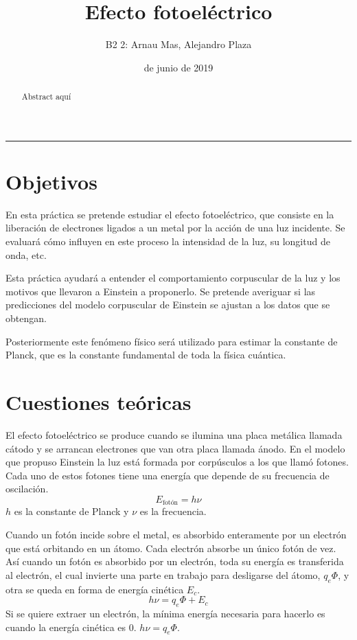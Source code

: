 \documentclass[12pt]{article}
\title{\sffamily {\bfseries Práctica 10:} Efecto fotoeléctrico}
\author{\sffamily B2 2: Arnau Mas, Alejandro Plaza}
\date{\sffamily 6 de junio de 2019}
\numberwithin{table}{section}
\numberwithin{figure}{section}
\numberwithin{equation}{section}
\begin{document}
\maketitle
\renewcommand{\abstractname}{\sffamily \bfseries Resumen:}
\begin{abstract}
	Abstract aquí
\end{abstract}
\hrule

\section{Objetivos}
En esta práctica se pretende estudiar el efecto fotoeléctrico, que consiste en la liberación de electrones ligados a un metal por la acción de una luz incidente. Se evaluará cómo influyen en este proceso la intensidad de la luz, su longitud de onda, etc.

Esta práctica ayudará a entender el comportamiento corpuscular de la luz y los motivos que llevaron a Einstein a proponerlo. Se pretende averiguar si las predicciones del modelo corpuscular de Einstein se ajustan a los datos que se obtengan.

Posteriormente este fenómeno físico será utilizado para estimar la constante de Planck, que es la constante fundamental de toda la física cuántica.

\section{Cuestiones teóricas}
El efecto fotoeléctrico se produce cuando se ilumina una placa metálica llamada cátodo y se arrancan electrones que van otra placa llamada ánodo. En el modelo que propuso Einstein la luz está formada por corpúsculos a los que llamó fotones. Cada uno de estos fotones tiene una energía que depende de su frecuencia de oscilación.
\begin{equation}\label{P10Efoton}
	E_{\text{fotón}}=h\nu
\end{equation}
$h$ es la constante de Planck y $\nu$ es la frecuencia.

Cuando un fotón incide sobre el metal, es absorbido enteramente por un electrón que está orbitando en un átomo. Cada electrón absorbe un único fotón de vez. Así cuando un fotón es absorbido por un electrón, toda su energía es transferida al electrón, el cual invierte una parte en trabajo para desligarse del átomo, $q_e\Phi$, y otra se queda en forma de energía cinética $E_c$.
\begin{equation}\label{P10ecuacion}
	h\nu=q_e\Phi+E_c
\end{equation}
Si se quiere extraer un electrón, la mínima energía necesaria para hacerlo es cuando la energía cinética es 0. $h\nu=q_e\Phi$.
\end{document}
